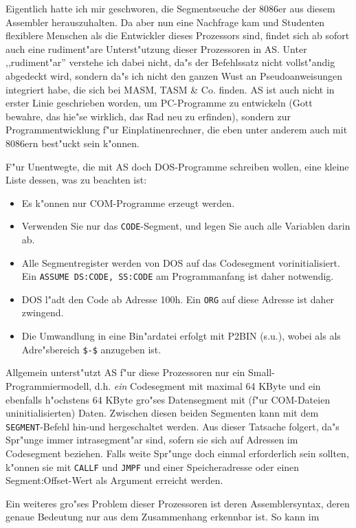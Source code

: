 \documentclass[12pt,a4paper,twoside]{report}
\newcommand{\ii}[1]{{\it #1}}
\newcommand{\tty}[1]{{\tt #1}}
\newcommand{\asname}{AS}
\begin{document}
Eigentlich hatte ich mir geschworen, die Segmentseuche der 8086er aus diesem
Assembler herauszuhalten.  Da aber nun eine Nachfrage kam und Studenten
flexiblere Menschen als die Entwickler dieses Prozessors sind, findet sich
ab sofort auch eine rudiment"are Unterst"utzung dieser Prozessoren in \asname{}.
Unter ,,rudiment"ar'' verstehe ich dabei nicht, da"s der Befehlssatz nicht
vollst"andig abgedeckt wird, sondern da"s ich nicht den ganzen Wust an
Pseudoanweisungen integriert habe, die sich bei MASM, TASM \& Co. finden.
\asname{} ist auch nicht in erster Linie geschrieben worden, um PC-Programme zu
entwickeln (Gott bewahre, das hie"se wirklich, das Rad neu zu erfinden),
sondern zur Programmentwicklung f"ur Einplatinenrechner, die eben unter
anderem auch mit 8086ern best"uckt sein k"onnen.
\par
F"ur Unentwegte, die mit \asname{} doch DOS-Programme schreiben wollen, eine kleine
Liste dessen, was zu beachten ist:
\begin{itemize}
\item{Es k"onnen nur COM-Programme erzeugt werden.}
\item{Verwenden Sie nur das \tty{CODE}-Segment, und legen Sie auch alle
      Variablen darin ab.}
\item{Alle Segmentregister werden von DOS auf das Codesegment
      vorinitialisiert.  Ein \tty{ASSUME DS:CODE, SS:CODE} am
      Programmanfang ist daher notwendig.}
\item{DOS l"adt den Code ab Adresse 100h.  Ein \tty{ORG} auf diese
      Adresse ist daher zwingend.}
\item{Die Umwandlung in eine Bin"ardatei erfolgt mit P2BIN (s.u.), wobei als
      als Adre"sbereich \tty{\$-\$} anzugeben ist.}
\end{itemize}
Allgemein unterst"utzt \asname{} f"ur diese Prozessoren nur ein Small-Programmiermodell, d.h.
\ii{ein} Codesegment mit maximal 64 KByte und ein ebenfalls h"ochstens 64
KByte gro"ses Datensegment mit (f"ur COM-Dateien uninitialisierten) Daten.
Zwischen diesen beiden Segmenten kann mit dem \tty{SEGMENT}-Befehl hin-und hergeschaltet werden.
Aus dieser Tatsache folgert, da"s Spr"unge immer intrasegment"ar sind,
sofern sie sich auf Adressen im Codesegment beziehen.  Falls weite Spr"unge
doch einmal erforderlich sein sollten, k"onnen sie mit \tty{CALLF} und
\tty{JMPF} und einer Speicheradresse oder einen Segment:Offset-Wert als
Argument erreicht werden.
\par
Ein weiteres gro"ses Problem dieser Prozessoren ist deren Assemblersyntax,
deren genaue Bedeutung nur aus dem Zusammenhang erkennbar ist.  So kann im
\end{document}
